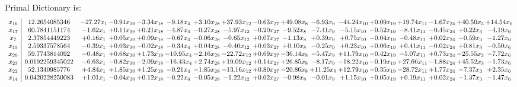 \documentclass[9pt]{article}
\begin{document}
Primal Dictionary is:
\[\begin{array}{c| c c@{\hskip 2pt} c@{\hskip 2pt} c@{\hskip 2pt} c@{\hskip 2pt} c@{\hskip 2pt} c@{\hskip 2pt} c@{\hskip 2pt} c@{\hskip 2pt} c@{\hskip 2pt} c@{\hskip 2pt} c@{\hskip 2pt} c@{\hskip 2pt} c@{\hskip 2pt} c@{\hskip 2pt} c@{\hskip 2pt} }
 x_{16}   &  12.2654085346 & -27.27 x_{1} & -0.91 x_{30} & -3.34 x_{18} & -9.18 x_{4} & +  3.10 x_{28} & + 37.93 x_{12} & -0.63 x_{27} & + 49.08 x_{8} & -6.93 x_{9} & -44.24 x_{10} & +  0.09 x_{19} & + 19.74 x_{11} & -1.67 x_{24} & + 40.50 x_{3} & + 14.54 x_{6}\\
 x_{17}   &  60.7841151174 & -1.62 x_{1} & +  0.11 x_{30} & +  0.21 x_{18} & -4.87 x_{4} & -0.27 x_{28} & -5.97 x_{12} & -0.20 x_{27} & -9.52 x_{8} & -7.41 x_{9} & -5.15 x_{10} & -0.52 x_{19} & -8.41 x_{11} & -0.45 x_{24} & +  0.22 x_{3} & -4.19 x_{6}\\
 x_{7}   &  2.37854449223 & +  0.16 x_{1} & +  0.05 x_{30} & +  0.09 x_{18} & -0.67 x_{4} & -0.06 x_{28} & -0.65 x_{12} & +  0.07 x_{27} & -1.13 x_{8} & +  0.39 x_{9} & +  0.75 x_{10} & -0.04 x_{19} & -0.48 x_{11} & +  0.02 x_{24} & -0.59 x_{3} & -1.27 x_{6}\\
 x_{15}   &  2.59337578564 & -0.39 x_{1} & +  0.03 x_{30} & -0.02 x_{18} & -0.34 x_{4} & +  0.04 x_{28} & -0.40 x_{12} & +  0.03 x_{27} & +  0.10 x_{8} & -0.25 x_{9} & +  0.23 x_{10} & +  0.06 x_{19} & +  0.41 x_{11} & -0.02 x_{24} & +  0.81 x_{3} & -0.50 x_{6}\\
 x_{20}   &  59.7743814092 & -0.48 x_{1} & +  0.68 x_{30} & +  1.73 x_{18} & -10.95 x_{4} & -2.16 x_{28} & -22.72 x_{12} & +  0.69 x_{27} & -36.14 x_{8} & -5.47 x_{9} & + 11.79 x_{10} & -0.42 x_{19} & -5.07 x_{11} & +  0.73 x_{24} & -25.55 x_{3} & -7.72 x_{6}\\
 x_{23}   &  0.0192259345022 & -6.63 x_{1} & -0.82 x_{30} & -2.09 x_{18} & -16.43 x_{4} & +  2.74 x_{28} & + 19.09 x_{12} & +  0.14 x_{27} & + 26.85 x_{8} & -8.17 x_{9} & -18.22 x_{10} & -0.19 x_{19} & + 27.66 x_{11} & -1.88 x_{24} & + 45.52 x_{3} & -1.73 x_{6}\\
 x_{22}   &  52.1340985776 & +  4.84 x_{1} & +  1.85 x_{30} & +  1.25 x_{18} & -0.21 x_{4} & -1.85 x_{28} & -13.16 x_{12} & +  0.80 x_{27} & -20.86 x_{8} & + 11.25 x_{9} & + 12.79 x_{10} & -0.35 x_{19} & -28.72 x_{11} & +  1.77 x_{24} & -7.37 x_{3} & +  2.35 x_{6}\\
 x_{14}   &  0.0420228250083 & +  1.01 x_{1} & -0.04 x_{30} & +  0.12 x_{18} & -0.22 x_{4} & -0.05 x_{28} & -1.22 x_{12} & +  0.02 x_{27} & -0.98 x_{8} & -0.01 x_{9} & +  1.15 x_{10} & +  0.05 x_{19} & +  0.19 x_{11} & +  0.02 x_{24} & -1.37 x_{3} & -1.47 x_{6}\\

\end{array}\]
\end{document}
